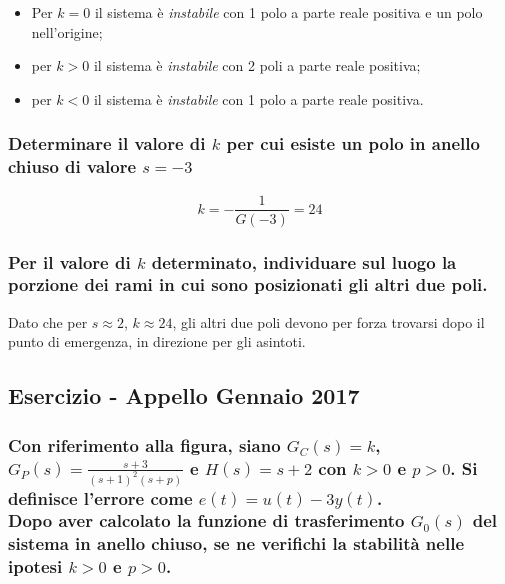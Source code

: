 \begin{itemize}
	\item Per \(k=0\) il sistema è \emph{instabile} con 1 polo a parte reale positiva e un polo nell'origine;
	\item per \(k>0\) il sistema è \emph{instabile} con 2 poli a parte reale positiva;
	\item per \(k<0\) il sistema è \emph{instabile} con 1 polo a parte reale positiva.
\end{itemize}

\subsubsection{Determinare il valore di \(k\) per cui esiste un polo in anello chiuso di valore \(s=-3\)}

\[k = -\frac{1}{G(-3)} = 24\]

\subsubsection{Per il valore di \(k\) determinato, individuare sul luogo la porzione dei rami in cui sono posizionati gli altri due poli.}

Dato che per \(s\approx2\), \(k\approx24\), gli altri due poli devono per forza trovarsi dopo il punto di emergenza, in direzione per gli asintoti.

\subsection{Esercizio - Appello Gennaio 2017}
\begin{center}\end{center}

\subsubsection{
Con riferimento alla figura, siano \(G_C(s)=k\), \(\displaystyle G_P(s)=\frac{s+3}{(s+1)^2(s+p)}\) e \(H(s)=s+2\) con \(k>0\) e \(p>0\). Si definisce l'errore come \(e(t)=u(t)-3y(t)\). \\
Dopo aver calcolato la funzione di trasferimento \(G_0(s)\) del sistema in anello chiuso, se ne verifichi la stabilità nelle ipotesi \(k>0\) e \(p>0\).
}

